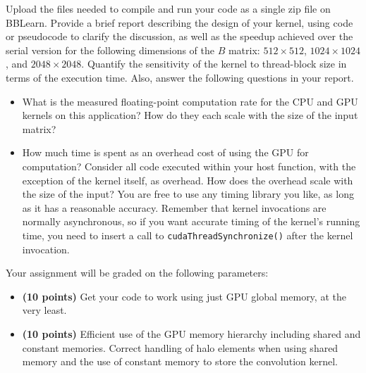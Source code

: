 \documentclass[12pt]{article}
\begin{document}
Upload the files needed to compile and run your code as a single zip file on BBLearn. Provide a brief report describing the design of your kernel, using code or pseudocode to clarify the discussion, as well as the speedup achieved over the serial version for the following dimensions of the $B$ matrix: $512 \times 512$, $1024 \times 1024$, and $2048 \times 2048$. Quantify the sensitivity of the kernel to thread-block size in terms of the execution time. Also, answer the following questions in your report.
\begin{itemize}
\item What is the measured floating-point computation rate for the CPU and GPU kernels on this application?  How do they each scale with the size of the input matrix?

\item  How much time is spent as an overhead cost of using the GPU for computation?  Consider all code executed within your host function, with the exception of the kernel itself, as overhead. How does the overhead scale with the size of the input? You are free to use any timing library you like, as long as it has a reasonable accuracy.  Remember that kernel invocations are normally asynchronous, so if you want accurate timing of the kernel's running time, you need to insert a call to \texttt{cudaThreadSynchronize()} after the kernel invocation.
\end{itemize}

\noindent Your assignment will be graded on the following parameters:
\begin{itemize}
\item \textbf{(10 points)} Get your code to work using just GPU global memory, at the very least.

\item \textbf{(10 points)} Efficient use of the GPU memory hierarchy including shared and constant memories. Correct handling of halo elements when using shared memory and the use of constant memory to store the convolution kernel.
\end{itemize}
\end{document}
